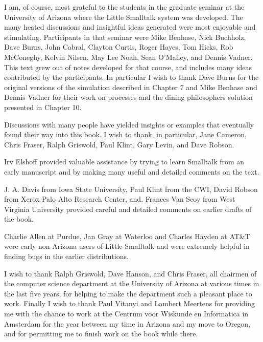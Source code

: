 \clearpage
{}





I am, of course, most grateful to the students in the graduate seminar at the
University of Arizona where the Little Smalltalk system was developed. The many
heated discussions and insightful ideas generated were most enjoyable and
stimulating. Participants in that seminar were Mike Benhase, Nick Buchholz, Dave
Burns, John Cabral, Clayton Curtis, Roger Hayes, Tom Hicks, Rob McConeghy,
Kelvin Nilsen, May Lee Noah, Sean O'Malley, and Dennis Vadner. This text grew
out of notes developed for that course, and includes many ideas contributed by
the participants. In particular I wish to thank Dave Burns for the original
versions of the simulation described in Chapter 7 and Mike Benhase and Dennis
Vadner for their work on processes and the dining philosophers solution
presented in Chapter 10.

Discussions with many people have yielded insights or examples that eventually
found their way into this book. I wish to thank, in particular, Jane Cameron,
Chris Fraser, Ralph Griswold, Paul Klint, Gary Levin, and Dave Robson.

Irv Elshoff provided valuable assistance by trying to learn Smalltalk from an
early manuscript and by making many useful and detailed comments on the text.

J. A. Davis from Iowa State University, Paul Klint from the CWI, David Robson
from Xerox Palo Alto Research Center, and. Frances Van Scoy from West Virginia
University provided careful and detailed comments on earlier drafts of the book.

Charlie Allen at Purdue, Jan Gray at Waterloo and Charles Hayden at AT\&T were
early non-Arizona users of Little Smalltalk and were extremely helpful in
finding bugs in the earlier distributions.

I wish to thank Ralph Griswold, Dave Hanson, and Chris Fraser, all chairmen of
the computer science department at the University of Arizona at various times in
the last five years, for helping to make the department such a pleasant place to
work. Finally I wish to thank Paul Vitanyi and Lambert Meertens for providing me
with the chance to work at the Centrum voor Wiskunde en Informatica in Amsterdam
for the year between my time in Arizona and my move to Oregon, and for
permitting me to finish work on the book while there.


